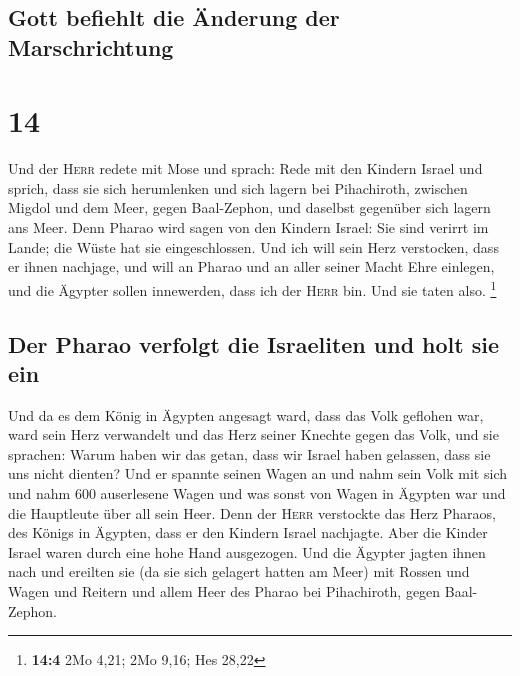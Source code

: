 \hypertarget{gott-befiehlt-die-uxe4nderung-der-marschrichtung}{%
\subsection{Gott befiehlt die Änderung der
Marschrichtung}\label{gott-befiehlt-die-uxe4nderung-der-marschrichtung}}

\hypertarget{section-13}{%
\section{14}\label{section-13}}

 Und der \textsc{Herr} redete mit Mose und sprach:
 Rede mit den Kindern Israel und sprich, dass sie sich
herumlenken und sich lagern bei Pihachiroth, zwischen Migdol und dem
Meer, gegen Baal-Zephon, und daselbst gegenüber sich lagern ans Meer.
 Denn Pharao wird sagen von den Kindern Israel: Sie sind
verirrt im Lande; die Wüste hat sie eingeschlossen.  Und
ich will sein Herz verstocken, dass er ihnen nachjage, und will an
Pharao und an aller seiner Macht Ehre einlegen, und die Ägypter sollen
innewerden, dass ich der \textsc{Herr} bin. Und sie taten also.
\footnote{\textbf{14:4} 2Mo 4,21; 2Mo 9,16; Hes 28,22}

\hypertarget{der-pharao-verfolgt-die-israeliten-und-holt-sie-ein}{%
\subsection{Der Pharao verfolgt die Israeliten und holt sie
ein}\label{der-pharao-verfolgt-die-israeliten-und-holt-sie-ein}}

 Und da es dem König in Ägypten angesagt ward, dass das
Volk geflohen war, ward sein Herz verwandelt und das Herz seiner Knechte
gegen das Volk, und sie sprachen: Warum haben wir das getan, dass wir
Israel haben gelassen, dass sie uns nicht dienten?  Und er
spannte seinen Wagen an und nahm sein Volk mit sich  und
nahm 600 auserlesene Wagen und was sonst von Wagen in Ägypten war und
die Hauptleute über all sein Heer.  Denn der \textsc{Herr}
verstockte das Herz Pharaos, des Königs in Ägypten, dass er den Kindern
Israel nachjagte. Aber die Kinder Israel waren durch eine hohe Hand
ausgezogen.  Und die Ägypter jagten ihnen nach und
ereilten sie (da sie sich gelagert hatten am Meer) mit Rossen und Wagen
und Reitern und allem Heer des Pharao bei Pihachiroth, gegen
Baal-Zephon.

